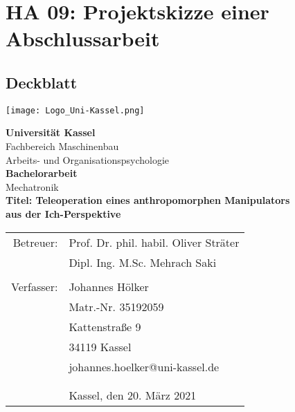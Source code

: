 \chapter{HA 09: Projektskizze einer Abschlussarbeit}
\section{Deckblatt}
\texttt{[image: Logo\_Uni-Kassel.png]}\vspace{50pt}
\begin{center}
\textbf{Universität Kassel}\\
Fachbereich Maschinenbau\\
Arbeits- und Organisationspsychologie\\\vspace{50pt}
\textbf{Bachelorarbeit}\\
Mechatronik\\\vspace{20pt}
\textbf{Titel: Teleoperation eines anthropomorphen Manipulators \\
aus der Ich-Perspektive}\\\vspace{50pt}

\begin{tabular}{rl}
Betreuer: & Prof. Dr. phil. habil. Oliver Sträter\\
 & Dipl. Ing. M.Sc. Mehrach Saki \\
  & \\
Verfasser: & Johannes Hölker\\
 & Matr.-Nr. 35192059\\
 & Kattenstraße 9\\
 & 34119 Kassel\\
 & johannes.hoelker@uni-kassel.de\\\vspace{40pt}
 & \\
 & \\
 & Kassel, den 20. März 2021\\
\end{tabular}
\end{center}
